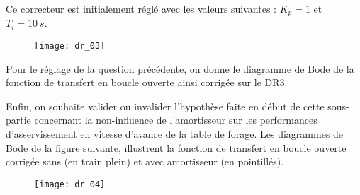  Ce correcteur est initialement réglé avec les valeurs suivantes : $K_p = 1$ et $T_i = \SI{10}{s}$. 
 
\ifprof
\begin{corrige}
\end{corrige}
\else
\fi

\begin{figure}[!h]
\texttt{[image: dr\_03]}
\end{figure}

 
Pour le réglage de la question précédente, on donne le diagramme de Bode de la fonction de 
transfert en boucle ouverte ainsi corrigée sur le DR3. 

\ifprof
\begin{corrige}
\end{corrige}
\else
\fi
 
 
Enfin, on souhaite valider ou invalider l’hypothèse faite en début de cette sous-partie concernant la 
non-influence de l’amortisseur sur les performances d’asservissement en vitesse d’avance de la 
table de forage. Les diagrammes de Bode de la figure suivante, 
illustrent la fonction de transfert en boucle ouverte corrigée sans (en train plein) et avec amortisseur 
(en pointillés). 
 
 
\begin{figure}[!h]
\texttt{[image: dr\_04]}
\end{figure}

 
\ifprof
\begin{corrige}
\end{corrige}
\else
\fi




